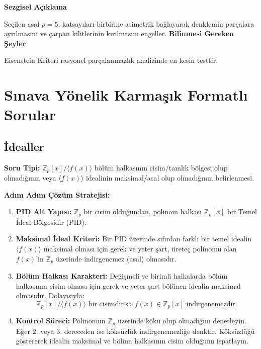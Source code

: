\documentclass[11pt, a4paper]{article}
\newenvironment{sezgisel}{
    \vspace{0.5cm}
    \noindent\textcolor{orange!80!black}{\faLightbulb\enspace \textbf{\Large Sezgisel Açıklama}}\par\vspace{0.2cm}
    \itshape
}{}
\newenvironment{bilgi}{
    \vspace{0.5cm}
    \noindent\textcolor{red!70!black}{\faExclamationTriangle\enspace \textbf{\Large Bilinmesi Gereken Şeyler}}\par\vspace{0.2cm}
}{}
\begin{document}
\begin{sezgisel}
Seçilen asal $p=5$, katsayıları birbirine asimetrik bağlayarak denklemin parçalara ayrılmasını ve çarpan kilitlerinin kırılmasını engeller.
\end{sezgisel}
\begin{bilgi}
Eisenstein Kriteri rasyonel parçalanmazlık analizinde en kesin testtir.
\end{bilgi}

\section{Sınava Yönelik Karmaşık Formatlı Sorular}
\subsection{İdealler}
\begin{konubox}[title={\faGraduationCap\enspace Soru Tipi ve Adım Adım Çözüm Stratejisi}]
\textbf{Soru Tipi:} $\mathbb{Z}_p[x] / \langle f(x) \rangle$ bölüm halkasının cisim/tamlık bölgesi olup olmadığının veya $\langle f(x) \rangle$ idealinin maksimal/asal olup olmadığının belirlenmesi.

\textbf{Adım Adım Çözüm Stratejisi:}
\begin{enumerate}
    \item \textbf{PID Alt Yapısı:} $\mathbb{Z}_p$ bir cisim olduğundan, polinom halkası $\mathbb{Z}_p[x]$ bir Temel İdeal Bölgesidir (PID).
    \item \textbf{Maksimal İdeal Kriteri:} Bir PID üzerinde sıfırdan farklı bir temel idealin $\langle f(x) \rangle$ maksimal olması için gerek ve yeter şart, üreteç polinomu olan $f(x)$'in $\mathbb{Z}_p$ üzerinde indirgenemez (asal) olmasıdır.
    \item \textbf{Bölüm Halkası Karakteri:} Değişmeli ve birimli halkalarda bölüm halkasının cisim olması için gerek ve yeter şart bölünen idealin maksimal olmasıdır. Dolayısıyla:
    \[ \mathbb{Z}_p[x] / \langle f(x) \rangle \text{ bir cisimdir} \iff f(x) \in \mathbb{Z}_p[x] \text{ indirgenemezdir.} \]
    \item \textbf{Kontrol Süreci:} Polinomun $\mathbb{Z}_p$ üzerinde kökü olup olmadığını denetleyin. Eğer 2. veya 3. dereceden ise köksüzlük indirgenemezliğe denktir. Köksüzlüğü göstererek idealin maksimal ve bölüm halkasının cisim olduğunu ispatlayın.
\end{enumerate}
\end{konubox}

\newpage
\end{document}
